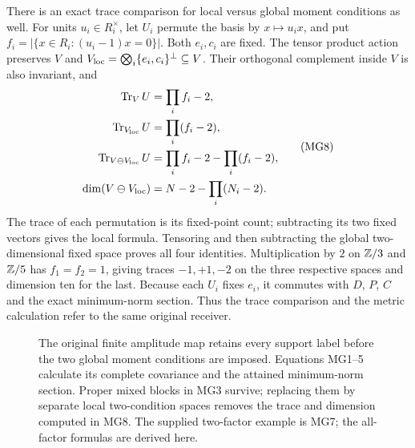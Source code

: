 There is an exact trace comparison for local versus global moment
conditions as well. For units $u_i\in R_i^\times$, let $U_i$
permute the basis by $x\mapsto u_ix$, and put
$f_i=|\{x\in R_i:(u_i-1)x=0\}|$. Both $e_i,c_i$ are fixed.
The tensor product action preserves $V$ and
$V_{\rm loc}=\bigotimes_i\{e_i,c_i\}^\perp\subseteq V$.
Their orthogonal complement inside $V$ is also invariant, and
\[
 \begin{aligned}
 \operatorname{Tr}_V U&=\prod_i f_i-2,\\
 \operatorname{Tr}_{V_{\rm loc}}U&=\prod_i(f_i-2),\\
 \operatorname{Tr}_{V\ominus V_{\rm loc}}U
 &=\prod_i f_i-2-\prod_i(f_i-2),\\
 \dim(V\ominus V_{\rm loc})&=N-2-\prod_i(N_i-2).
 \end{aligned}
 \tag{MG8}\label{mg:trace}
\]
The trace of each permutation is its fixed-point count; subtracting
its two fixed vectors gives the local formula. Tensoring and then
subtracting the global two-dimensional fixed space proves all four
identities. Multiplication by $2$ on $\mathbb Z/3$ and $\mathbb Z/5$ has
$f_1=f_2=1$, giving traces $-1,+1,-2$ on the three respective
spaces and dimension ten for the last. Because each $U_i$ fixes
$e_i$, it commutes with $D$, $P$, $C$ and the exact minimum-norm
section. Thus the trace comparison and the metric calculation
refer to the same original receiver.

\begin{figure}[ht]
\centering
{}
\caption{The original finite amplitude map retains every support
label before the two global moment conditions are imposed.
Equations MG1--5 calculate its complete covariance and the attained
minimum-norm section. Proper mixed blocks in MG3 survive; replacing
them by separate local two-condition spaces removes the trace and
dimension computed in MG8. The supplied two-factor example is
MG7; the all-factor formulas are derived here.}
\end{figure}
